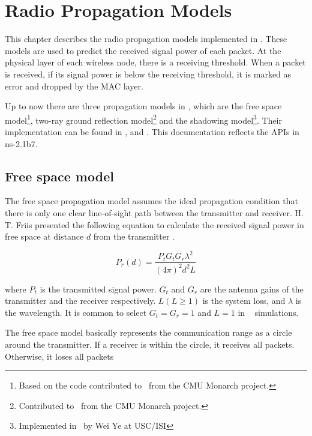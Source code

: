 
\chapter{Radio Propagation Models}
\label{chap:propagation}

This chapter describes the radio propagation models implemented in \ns.
These models are used to predict the received signal power of
each packet. At the physical layer of each wireless node, there is a receiving
threshold. When a packet is received, if its signal power is below the receiving
threshold, it is marked as error and dropped by the MAC layer.

Up to now there are three propagation models in \ns, which are the free
space model\footnote{Based on the code contributed to \ns~from the CMU Monarch
project.}, two-ray ground reflection model\footnote{Contributed to \ns~from the
CMU Monarch project.} and the shadowing model\footnote{Implemented in \ns~by
Wei Ye at USC/ISI}. Their implementation can be found in ,
 and . This documentation
reflects the APIs in ns-2.1b7.

\section{Free space model}
\label{sec:freespace}

The free space propagation model assumes the ideal propagation condition
that there is only one clear line-of-sight path between the transmitter and
receiver. H. T. Friis presented the following equation to
calculate the received signal power in free space at distance $d$ from the
transmitter \cite{Friis46}.

\begin{equation}
  P_r (d) = \frac{P_t G_t G_r \lambda^2}{(4\pi)^2 d^2 L}
  \label{eqn:freespace}
\end{equation}

where $P_t$ is the transmitted signal power. $G_t$ and $G_r$ are the antenna
gains of the transmitter and the receiver respectively. $L (L\ge1)$ is the
system loss, and $\lambda$ is the wavelength. It is common to select
$G_t = G_r = 1$ and $L = 1$ in \ns~ simulations.

The free space model basically represents the communication range as a circle
around the transmitter. If a receiver is within the circle, it receives all
packets. Otherwise, it loses all packets

